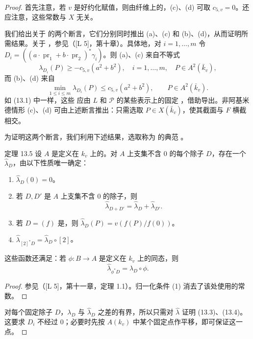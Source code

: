 \begin{proof}
首先注意，若 $v$ 是好约化赋值，则由纤维上的，(c)、(d) 可取 $c_{5,v}=0$。还应注意，这些常数与 $X$ 无关。

我们给出关于 的两个断言，它们分别同时推出 (a)、(c) 和 (b)、(d)，从而证明所需结果。关于 ，参见（[L 5]，第十章）。具体地，对 $i=1,\ldots,m$ 令 $D_i=((a\cdot\operatorname{pr}_1+b\cdot\operatorname{pr}_2)^*\gamma_i)$。则 (a)、(c) 来自不等式
\begin{equation*}\tag{13.3}
\lambda_{D_i}(P)\ge-c_{5,v}(a^2+b^2),
\quad i=1,\ldots,m,\quad P\in A^2(\bar k_v),
\end{equation*}
而 (b)、(d) 来自
\begin{equation*}\tag{13.4}
\min_{1\le i\le m}\lambda_{D_i}(P)\le c_{5,v}(a^2+b^2),
\qquad P\in A^2(\bar k_v).
\end{equation*}
如 (13.1) 中一样，这些 应由 $L$ 和 $\mathscr P$ 的某些表示上的固定 ，借助导出。非阿基米德情形 (c)、(d) 可由上述断言推出：只需选取 $P\in X(\bar k_v)$，使其截面与 $F$ 横截相交。

为证明这两个断言，我们利用下述结果，选取称为 的典范 。
\begin{statement}{定理 13.5}
设 $A$ 是定义在 $k_v$ 上的。对 $A$ 上支集不含 $0$ 的每个除子 $D$，存在一个  $\hat\lambda_D$，由以下性质唯一确定：
\begin{enumerate}[label=(\arabic*).]
\item $\hat\lambda_D(0)=0$。
\item 若 $D,D'$ 是 $A$ 上支集不含 $0$ 的除子，则
\[
\hat\lambda_{D+D'}=\hat\lambda_D+\hat\lambda_{D'}.
\]
\item 若 $D=(f)$ 是，则 $\hat\lambda_D(P)=v(f(P)/f(0))$。
\item $\hat\lambda_{[2]^*D}=\hat\lambda_D\circ[2]$。
\end{enumerate}
这些函数还满足：若 $\phi:B\to A$ 是定义在 $k_v$ 上的同态，则
\begin{equation*}\tag{13.6}
\hat\lambda_{\phi^*D}=\hat\lambda_D\circ\phi.
\end{equation*}
\end{statement}
\begin{proof}
参见（[L 5]，第十一章，定理 1.1）。归一化条件 (1) 消去了该处使用的常数。
\end{proof}
对每个固定除子 $D$，$\lambda_D$ 与 $\hat\lambda_D$ 之差的有界，所以只需对 $\hat\lambda$ 证明 (13.3)、(13.4)。这要求 $D_i$ 不经过 $0$；必要时先按 $A(k_v)$ 中某个固定点作平移，即可保证这一点。


\end{proof}
